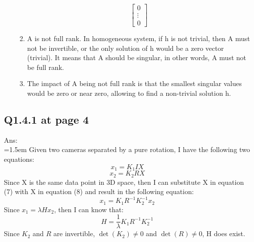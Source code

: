 \documentclass{article}
\begin{document}
\begin{enumerate}
\begin{enumerate}
\[\begin{bmatrix}
					0 \\
					\vdots \\
					0
				\end{bmatrix}
				\]
				\item A is not full rank. In homogeneous system, if h is not trivial, then A must not be invertible, or the only solution of h would be a zero vector (trivial). It means that A should be singular, in other words, A must not be full rank.
				\item The impact of A being not full rank is that the smallest singular values would be zero or near zero, allowing to find a non-trivial solution h.
			\end{enumerate}
	\end{enumerate}

	\newpage
	\subsection*{Q1.4.1 at page 4}
	Ans:\\
	\hangindent=1.5em \hspace{1.5em} Given two cameras separated by a pure rotation, I have the following two equations:
	\begin{equation}
		x_1 = K_1 I X
	\end{equation}
	\begin{equation}
		x_2 = K_2 R X
	\end{equation}
	Since X is the same data point in 3D space, then I can substitute X in equation (7) with X in equation (8) and result in the following equation:
	\begin{equation}
		x_1 = K_1 R^{-1} K_2^{-1} x_2
	\end{equation}
	Since $x_1 = \lambda H x_2$, then I can know that:
	\begin{equation}
		H = \frac{1}{\lambda} K_1 R^{-1} K_2^{-1}
	\end{equation}
	Since $K_2$ and $R$ are invertible, $\det(K_2) \neq 0$ and $\det(R) \neq 0$, H does exist.
	
	\newpage
\end{document}
